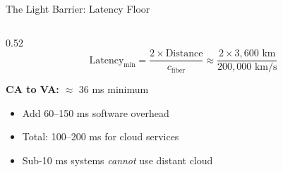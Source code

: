 \documentclass[aspectratio=169, 12pt]{beamer}
\begin{document}
\begin{frame}{The Light Barrier: Latency Floor}
\note{
%
%
%
%
%
}

\small
\begin{columns}[T]
  \begin{column}{0.52\textwidth}
    $$\text{Latency}_{\min} = \frac{2 \times \text{Distance}}{c_{\text{fiber}}} \approx \frac{2 \times 3{,}600 \text{ km}}{200{,}000 \text{ km/s}}$$

    \vspace{0.15cm}
    \textbf{CA to VA:} $\approx$ \alert{36 ms minimum}

    \vspace{0.15cm}
    {\footnotesize
    \begin{itemize}\setlength\itemsep{1pt}
      \item Add 60--150 ms software overhead
      \item Total: 100--200 ms for cloud services
      \item Sub-10 ms systems \emph{cannot} use distant cloud
    \end{itemize}
    }


\end{column}
\end{columns}
\end{frame}
\end{document}
